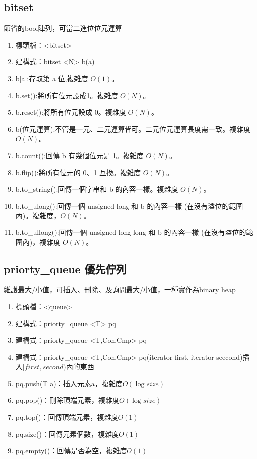 \subsection{bitset} 
節省的bool陣列，可當二進位位元運算
\begin{enumerate}
\item 標頭檔：<bitset>
\item 建構式：bitset <N> b(a)
\item b[a]:存取第 a 位,複雜度 $O(1)$。
\item b.set():將所有位元設成1。複雜度 $O(N)$。
\item b.reset():將所有位元設成 0。複雜度 $O(N)$。
\item b(位元運算):不管是一元、二元運算皆可。二元位元運算長度需一致。複雜度 $O(N)$。
\item b.count():回傳 b 有幾個位元是 1。複雜度 $O(N)$。
\item b.flip():將所有位元的 0、1 互換。複雜度 $O(N)$。
\item b.to\_string():回傳一個字串和 b 的內容一樣。複雜度 $O(N)$。
\item b.to\_ulong():回傳一個 unsigned long 和 b 的內容一樣 (在沒有溢位的範圍內)。複雜度，$O(N)$。
\item b.to\_ullong():回傳一個 unsigned long long 和 b 的內容一樣 (在沒有溢位的範圍內)，複雜度 $O(N)$。
\end{enumerate}
\subsection{priorty\_queue 優先佇列} 
維護最大/小值，可插入、刪除、及詢問最大/小值，一種實作為binary heap

\begin{enumerate}
\item 標頭檔：<queue>
\item 建構式：priorty\_queue <T> pq
\item 建構式：priorty\_queue <T,Con,Cmp> pq
\item 建構式：priorty\_queue <T,Con,Cmp> pq(iterator first, iterator seecond)插入$[first,second)$內的東西
\item pq.push(T a)：插入元素a，複雜度$O(\log size)$
\item pq.pop()：刪除頂端元素，複雜度$O(\log size)$
\item pq.top()：回傳頂端元素，複雜度$O(1)$
\item pq.size()：回傳元素個數，複雜度$O(1)$
\item pq.empty()：回傳是否為空，複雜度$O(1)$
\end{enumerate}

